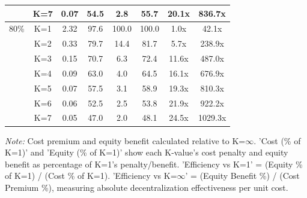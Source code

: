 \documentclass[preprint,12pt,nopreprintline]{elsarticle}
\begin{document}
\begin{table}[htbp]
{\begin{tabular}{cccccccc}
 & K=7 & 0.07 & 54.5 & 2.8 & 55.7 & 20.1x & 836.7x \\
\midrule
80\% & K=1 & 2.32 & 97.6 & 100.0 & 100.0 & 1.0x & 42.1x \\
 & K=2 & 0.33 & 79.7 & 14.4 & 81.7 & 5.7x & 238.9x \\
 & K=3 & 0.15 & 70.7 & 6.3 & 72.4 & 11.6x & 487.0x \\
 & K=4 & 0.09 & 63.0 & 4.0 & 64.5 & 16.1x & 676.9x \\
 & K=5 & 0.07 & 57.5 & 3.1 & 58.9 & 19.3x & 810.3x \\
 & K=6 & 0.06 & 52.5 & 2.5 & 53.8 & 21.9x & 922.2x \\
 & K=7 & 0.05 & 47.0 & 2.0 & 48.1 & 24.5x & 1029.3x \\
\bottomrule
\end{tabular}}
\begin{tablenotes}
\small
\item \textit{Note:} Cost premium and equity benefit calculated relative to K=$\infty$. 
'Cost (\% of K=1)' and 'Equity (\% of K=1)' show each K-value's cost penalty and equity benefit as percentage of K=1's penalty/benefit. 
'Efficiency vs K=1' = (Equity \% of K=1) / (Cost \% of K=1). 
'Efficiency vs K=$\infty$' = (Equity Benefit \%) / (Cost Premium \%), measuring absolute decentralization effectiveness per unit cost.
\end{tablenotes}
\end{table}
\end{document}
